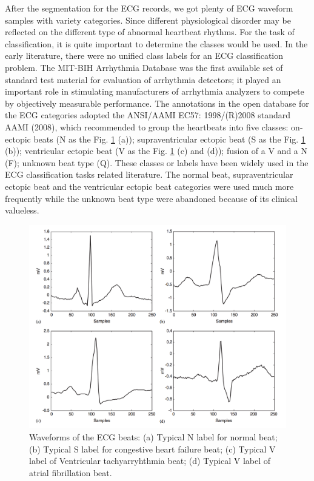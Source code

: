 \documentclass[journal]{IEEEtran}
\begin{document}
After the segmentation for the ECG records, we got plenty of ECG waveform samples with variety categories. Since different physiological disorder may be reflected on the different type of abnormal heartbeat rhythms. For the task of classification, it is quite important to determine the classes would be used. In the early literature, there were no unified class labels for an ECG classification problem. The MIT-BIH Arrhythmia Database was the first available set of standard test material for evaluation of arrhythmia detectors; it played an important role in stimulating manufacturers of arrhythmia analyzers to compete by objectively measurable performance. The annotations in the open database for the ECG categories adopted the ANSI/AAMI EC57: 1998/(R)2008 standard AAMI (2008), which recommended to group the heartbeats into five classes: on-ectopic beats (N as the Fig. \ref{figure2} (a)); supraventricular ectopic beat (S as the Fig. \ref{figure2} (b)); ventricular ectopic beat (V as the Fig. \ref{figure2} (c) and (d)); fusion of a V and a N (F); unknown beat type (Q). These classes or labels have been widely used in the ECG classification tasks related literature. The normal beat, supraventricular ectopic beat and the ventricular ectopic beat categories were used much more frequently while the unknown beat type were abandoned because of its clinical valueless.  

\begin{figure}[]
\centering
\includegraphics[width=3.5 in]{eps/figure2_ecg_beats.png}
\caption{Waveforms of the ECG beats: (a) Typical N label for normal beat; (b) Typical S label for congestive heart failure beat; (c) Typical V label of Ventricular tachyarryhthmia beat; (d) Typical V label of atrial fibrillation beat.}
\label{figure2}
\end{figure}
\end{document}
